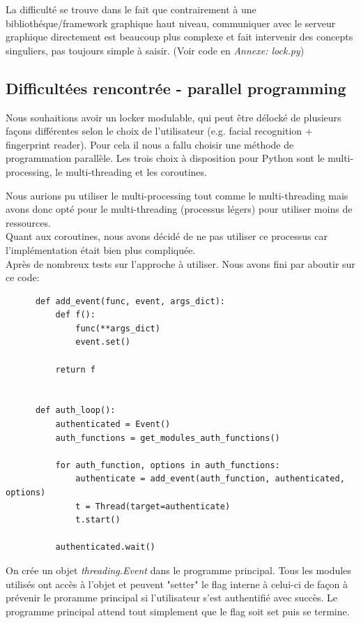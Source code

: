 \documentclass[french]{report}
\begin{document}
La difficulté se trouve dans le fait que contrairement à une bibliothéque/framework
graphique haut niveau, communiquer avec le serveur graphique directement est
beaucoup plus complexe et fait intervenir des concepts singuliers, pas toujours
simple à saisir. (Voir code en \emph{Annexe: lock.py})

\subsection{Difficultées rencontrée - parallel programming}
Nous souhaitions avoir un locker modulable, qui peut être délocké de plusieurs
façons différentes selon le choix de l'utilisateur (e.g. facial recognition
+ fingerprint reader). Pour cela il nous a fallu choisir une méthode de programmation
parallèle. Les trois choix à disposition pour Python sont le multi-processing,
le multi-threading et les coroutines.

Nous aurions pu utiliser le multi-processing tout comme le multi-threading mais avons donc
opté pour le multi-threading (processus légers) pour utiliser moins de ressources.\\
Quant aux coroutines, nous avons décidé de ne pas utiliser ce processus car l'implémentation
était bien plus compliquée.
\\
Après de nombreux tests sur l'approche à utiliser. Nous avons fini par aboutir sur ce code:

  \begin{verbatim}
      def add_event(func, event, args_dict):
          def f():
              func(**args_dict)
              event.set()

          return f


      def auth_loop():
          authenticated = Event()
          auth_functions = get_modules_auth_functions()

          for auth_function, options in auth_functions:
              authenticate = add_event(auth_function, authenticated, options)
              t = Thread(target=authenticate)
              t.start()

          authenticated.wait()
    \end{verbatim}

On crée un objet \emph{threading.Event} dans le programme principal. Tous les modules
utilisés ont accès à l'objet et peuvent "setter" le flag interne à celui-ci de façon
à prévenir le proramme principal si l'utilisateur s'est authentifié avec succès.
Le programme principal attend tout simplement que le flag soit set puis se termine.
\end{document}
